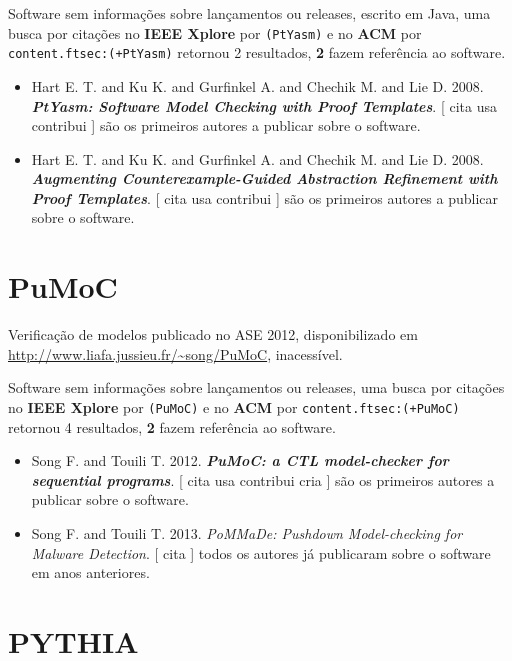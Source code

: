Software sem informações sobre lançamentos ou releases,
escrito em Java,
uma busca por citações no {\bf IEEE Xplore} por
\texttt{(PtYasm)}
e no {\bf ACM} por
\texttt{content.ftsec:(+PtYasm)}
retornou
2 resultados,
{\bf 2} fazem referência ao software.

\begin{itemize}
\item Hart E. T. and Ku K. and Gurfinkel A. and Chechik M. and Lie D.
      2008.
        \textbf{\textit{ PtYasm: Software Model Checking with Proof Templates}}.
      [
          cita
          usa
          contribui
      ]
são os primeiros autores a publicar sobre o software.
\item Hart E. T. and Ku K. and Gurfinkel A. and Chechik M. and Lie D.
      2008.
        \textbf{\textit{ Augmenting Counterexample-Guided Abstraction Refinement with Proof Templates}}.
      [
          cita
          usa
          contribui
      ]
são os primeiros autores a publicar sobre o software.
\end{itemize}
\section{PuMoC}

Verificação de modelos
publicado no ASE 2012,
disponibilizado em \url{http://www.liafa.jussieu.fr/~song/PuMoC},
inacessível.

Software sem informações sobre lançamentos ou releases,
uma busca por citações no {\bf IEEE Xplore} por
\texttt{(PuMoC)}
e no {\bf ACM} por
\texttt{content.ftsec:(+PuMoC)}
retornou
4 resultados,
{\bf 2} fazem referência ao software.

\begin{itemize}
\item Song F. and Touili T.
      2012.
        \textbf{\textit{ PuMoC: a CTL model-checker for sequential programs}}.
      [
          cita
          usa
          contribui
          cria
      ]
são os primeiros autores a publicar sobre o software.
\item Song F. and Touili T.
      2013.
        \textit{ PoMMaDe: Pushdown Model-checking for Malware Detection}.
      [
          cita
      ]
todos os autores já publicaram sobre o software em anos anteriores.
\end{itemize}
\section{PYTHIA}

